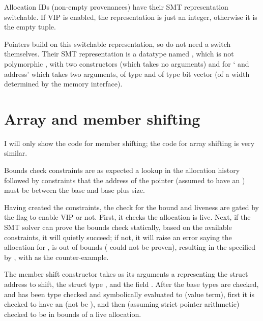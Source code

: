 Allocation IDs (non-empty provenances) have their SMT representation
switchable. If VIP is enabled, the representation is just an integer, otherwise
it is the empty tuple.


Pointers build on this switchable representation, so do not need a switch
themselves. Their SMT representation is a datatype named
, which is not polymorphic \ocamlinline{[]}, with two %
constructors  (which takes no arguments) and
 for ` and address' which takes two arguments,
 of type  and %
 of type bit vector (of a width determined by the memory %
interface).


\section{Array and member shifting}

I will only show the code for member shifting; the code for array shifting is
very similar.

Bounds check constraints are as expected \textemdash{} a lookup in the
allocation history followed by constraints that the address of the pointer
(assumed to have an ) must be between the base and base plus
size.


Having created the constraints, the check for the bound and liveness are gated
by the flag to enable VIP or not. First, it checks the allocation is live.
Next, if the SMT solver can prove the bounds check statically, based on the
available constraints, it will quietly succeed; if not, it will raise an error
saying the allocation for , is out of bounds
( could not be proven), resulting in the  specified
by , with  as the counter-example.


The member shift constructor takes as its arguments a 
representing the struct address to shift, the struct type ,
and the field . After the base types are checked, and
 has been type checked and symbolically evaluated to
 (value term), first it is checked to have an 
(not be ), and then (assuming strict pointer arithmetic) checked to
be in bounds of a live allocation.

